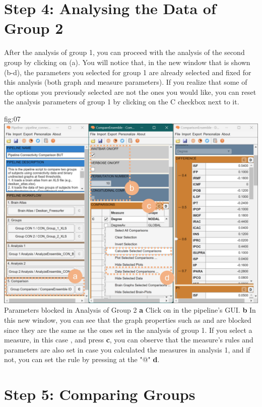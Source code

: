 \documentclass[justified]{tufte-handout}
\begin{document}
\section{Step 4: Analysing the Data of Group 2}

After the analysis of group 1, you can proceed with the analysis of the second group by clicking on  (a). You will notice that, in the new window that is shown (b-d), the parameters you selected for group 1 are already selected and fixed for this analysis (both graph and measure parameters). If you realize that some of the options you previously selected are not the ones you would like, you can reset the analysis parameters of group 1 by clicking on the C checkbox next to it.

	{fig:07}
	{
	\includegraphics{fig07.jpg}
	}
	{Parameters blocked in Analysis of Group 2}
	{
	{\bf a} Click on  in the pipeline's GUI.
	{\bf b} In this new window, you can see that the graph properties such as  and  are blocked since they are the same as the ones set in the analysis of group 1. If you select a measure, in this case , and press  {\bf c}, you can observe that the measure's rules and parameters are also set in case you calculated the measures in analysis 1, and if not, you can set the rule by pressing at the "@" {\bf d}.
	}
 
\section{Step 5: Comparing Groups}
\end{document}
